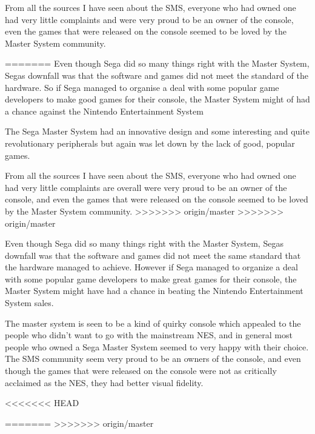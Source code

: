 \documentclass{scrartcl}
\begin{document}
From all the sources I have seen about the SMS, everyone who had owned one had very little complaints and were very proud to be an owner of the console, even the games that were released on the console seemed to be loved by the Master System community.

=======
Even though Sega did so many things right with the Master System, Segas downfall was that the software and games did not meet the standard of the hardware. So if Sega managed to organise a deal with some popular game developers to make good games for their console, the Master System might of had a chance against the Nintendo Entertainment System

The Sega Master System had an innovative design and some interesting and quite revolutionary peripherals but again was let down by the lack of good, popular games. 

From all the sources I have seen about the SMS, everyone who had owned one had very little complaints are overall were very proud to be an owner of the console, and even the games that were released on the console seemed to be loved by the Master System community. 
>>>>>>> origin/master
>>>>>>> origin/master

Even though Sega did so many things right with the Master System, Segas downfall was that the software and games did not meet the same standard that the hardware managed to achieve. However if Sega managed to organize a deal with some popular game developers to make great games for their console, the Master System might have had a chance in beating the Nintendo Entertainment System sales.

The master system is seen to be a kind of quirky console which appealed to the people who didn't want to go with the mainstream NES, and in general most people who owned a Sega Master System seemed to very happy with their choice. The SMS community seem very proud to be an owners of the console,  and even though the games that were released on the console were not as critically acclaimed as the NES, they had better visual fidelity.






<<<<<<< HEAD

=======
>>>>>>> origin/master
\end{document}
